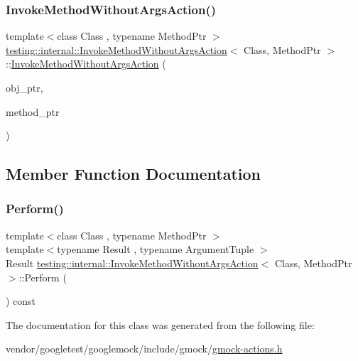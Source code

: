 \subsubsection{\texorpdfstring{Invoke\+Method\+Without\+Args\+Action()}{InvokeMethodWithoutArgsAction()}}
{\footnotesize\ttfamily template$<$class Class , typename Method\+Ptr $>$ \\
\hyperlink{classtesting_1_1internal_1_1_invoke_method_without_args_action}{testing\+::internal\+::\+Invoke\+Method\+Without\+Args\+Action}$<$ Class, Method\+Ptr $>$\+::\hyperlink{classtesting_1_1internal_1_1_invoke_method_without_args_action}{Invoke\+Method\+Without\+Args\+Action} (\begin{DoxyParamCaption}\item[{Class $\ast$}]{obj\+\_\+ptr,  }\item[{Method\+Ptr}]{method\+\_\+ptr }\end{DoxyParamCaption})\hspace{0.3cm}{\ttfamily [inline]}}



\subsection{Member Function Documentation}
\mbox{\label{classtesting_1_1internal_1_1_invoke_method_without_args_action_a9915e4f7a064e00b7798216644670b52}} 
\subsubsection{\texorpdfstring{Perform()}{Perform()}}
{\footnotesize\ttfamily template$<$class Class , typename Method\+Ptr $>$ \\
template$<$typename Result , typename Argument\+Tuple $>$ \\
Result \hyperlink{classtesting_1_1internal_1_1_invoke_method_without_args_action}{testing\+::internal\+::\+Invoke\+Method\+Without\+Args\+Action}$<$ Class, Method\+Ptr $>$\+::Perform (\begin{DoxyParamCaption}\item[{const Argument\+Tuple \&}]{ }\end{DoxyParamCaption}) const\hspace{0.3cm}{\ttfamily [inline]}}



The documentation for this class was generated from the following file\+:\begin{DoxyCompactItemize}
\item 
vendor/googletest/googlemock/include/gmock/\hyperlink{gmock-actions_8h}{gmock-\/actions.\+h}\end{DoxyCompactItemize}
